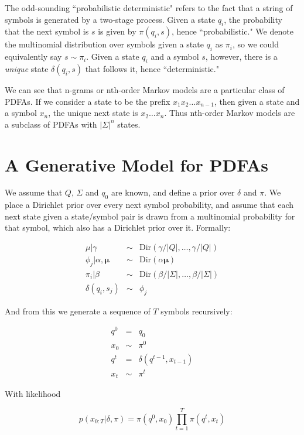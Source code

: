 \documentclass[11pt]{article}
\begin{document}
The odd-sounding ``probabilistic deterministic" refers to the fact that a string of symbols is generated by a two-stage process.  Given a state $q_i$, the probability that the next symbol is $s$ is given by $\pi(q_i,s)$, hence ``probabilistic."  We denote the multinomial distribution over symbols given a state $q_i$ as $\pi_i$, so we could equivalently say $s \sim \pi_i$.  Given a state $q_i$ and a symbol $s$, however, there is a {\it unique} state $\delta(q_i,s)$ that follows it, hence ``deterministic."  

We can see that n-grams or nth-order Markov models are a particular class of PDFAs.  If we consider a state to be the prefix $x_1 x_2 \ldots x_{n-1}$, then given a state and a symbol $x_n$, the unique next state is $x_2 \ldots x_n$.  Thus nth-order Markov models are a subclass of PDFAs with $|\Sigma|^n$ states.

\section{A Generative Model for PDFAs}

We assume that $Q$, $\Sigma$ and $q_0$ are known, and define a prior over $\delta$ and $\pi$.  We place a Dirichlet prior over every next symbol probability, and assume that each next state given a state/symbol pair is drawn from a multinomial probability for that symbol, which also has a Dirichlet prior over it.  Formally:

\begin{eqnarray}
\mu|\gamma & \sim & \mathrm{Dir}\left(\gamma/|Q|,\ldots,\gamma/|Q|\right) \\
\phi_{j}|\alpha,\mathbf{\mu}  & \sim & \mathrm{Dir}(\alpha\mathbf{\mu}) \\
\pi_{i}|\beta & \sim & \mathrm{Dir}(\beta/|\Sigma|,\ldots,\beta/|\Sigma|)\\
\delta(q_i,s_j) & \sim & \phi_{j}
\end{eqnarray}

And from this we generate a sequence of $T$ symbols recursively:

\begin{eqnarray*}
q^0 & = & q_0 \\
x_0 & \sim & \pi^0 \\
q^t & = & \delta(q^{t-1},x_{t-1}) \\
x_t & \sim & \pi^t
\end{eqnarray*}

With likelihood

\[ p(x_{0:T}|\delta,\pi) = \pi(q^0,x_0)\prod_{t=1}^T \pi(q^t,x_t) \]
\end{document}
